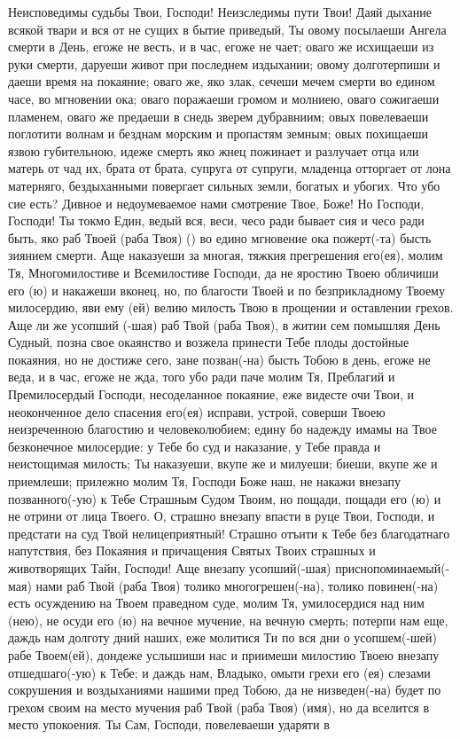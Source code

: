 \mychapterending{}

\begin{mymulticols}
 

Неисповедимы судьбы Твои, Господи! Неизследимы пути Твои! Даяй дыхание всякой твари и вся от не сущих в бытие приведый, Ты овому посылаеши Ангела смерти в День, егоже не весть, и в час, егоже не чает; оваго же исхищаеши из руки смерти, даруеши живот при последнем издыхании; овому долготерпиши и даеши время на покаяние; оваго же, яко злак, сечеши мечем смерти во едином часе, во мгновении ока; оваго поражаеши громом и молниею, оваго сожигаеши пламенем, оваго же предаеши в снедь зверем дубравниим; овых повелеваеши поглотити волнам и безднам морским и пропастям земным; овых похищаеши язвою губительною, идеже смерть яко жнец пожинает и разлучает отца или матерь от чад их, брата от брата, супруга от супруги, младенца отторгает от лона матерняго, бездыханными повергает сильных земли, богатых и убогих. Что убо сие есть? Дивное и недоумеваемое нами смотрение Твое, Боже! Но Господи, Господи! Ты токмо Един, ведый вся, веси, чесо ради бывает сия и чесо ради быть, яко раб Твоей (раба Твоя) () во едино мгновение ока пожерт(-та) бысть зиянием смерти. Аще наказуеши за многая, тяжкия прегрешения его(ея), молим Тя, Многомилостиве и Всемилостиве Господи, да не яростию Твоею обличиши его (ю) и накажеши вконец, но, по благости Твоей и по безприкладному Твоему милосердию, яви ему (ей) велию милость Твою в прощении и оставлении грехов. Аще ли же усопший (-шая) раб Твой (раба Твоя), в житии сем помышляя День Судный, позна свое окаянство и возжела принести Тебе плоды достойные покаяния, но не достиже сего, зане позван(-на) бысть Тобою в день, егоже не веда, и в час, егоже не жда, того убо ради паче молим Тя, Преблагий и Премилосердый Господи, несоделанное покаяние, еже видесте очи Твои, и неоконченное дело спасения его(ея) исправи, устрой, соверши Твоею неизреченною благостию и человеколюбием; едину бо надежду имамы на Твое безконечное милосердие: у Тебе бо суд и наказание, у Тебе правда и неистощимая милость; Ты наказуеши, вкупе же и милуеши; биеши, вкупе же и приемлеши; прилежно молим Тя, Господи Боже наш, не накажи внезапу позванного(-ую) к Тебе Страшным Судом Твоим, но пощади, пощади его (ю) и не отрини от лица Твоего. О, страшно внезапу впасти в руце Твои, Господи, и предстати на суд Твой нелицеприятный! Страшно отъити к Тебе без благодатнаго напутствия, без Покаяния и причащения Святых Твоих страшных и животворящих Тайн, Господи! Аще внезапу усопший(-шая) приснопоминаемый(-мая) нами раб Твой (раба Твоя) толико многогрешен(-на), толико повинен(-на) есть осуждению на Твоем праведном суде, молим Тя, умилосердися над ним (нею), не осуди его (ю) на вечное мучение, на вечную смерть; потерпи нам еще, даждь нам долготу дний наших, еже молитися Ти по вся дни о усопшем(-шей) рабе Твоем(ей), дондеже услышиши нас и приимеши милостию Твоею внезапу отшедшаго(-ую) к Тебе; и даждь нам, Владыко, омыти грехи его (ея) слезами сокрушения и воздыханиями нашими пред Тобою, да не низведен(-на) будет по грехом своим на место мучения раб Твой (раба Твоя) (имя), но да вселится в место упокоения. Ты Сам, Господи, повелеваеши ударяти в 
\end{mymulticols}
